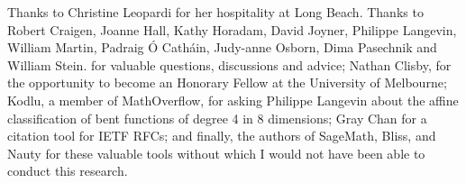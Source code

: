 \documentclass[12pt,a4paper]{article}
\begin{document}
Thanks to Christine Leopardi for her hospitality at Long Beach.
Thanks to
Robert Craigen,
Joanne Hall,
Kathy Horadam,
David Joyner,
Philippe Langevin,
William Martin,
Padraig {\'O} Cath{\'a}in,
Judy-anne Osborn,
Dima Pasechnik and
William Stein.
for valuable questions, discussions and advice;
Nathan Clisby, for the opportunity to become an Honorary Fellow at the University of Melbourne;
Kodlu, a member of MathOverflow, for asking Philippe Langevin about the affine classification
of bent functions of degree 4 in 8 dimensions;
Gray Chan for a citation tool for IETF RFCs;
and finally, the authors of SageMath, Bliss, and Nauty for these valuable tools
without which I would not have been able to conduct this research.









%
\end{document}

